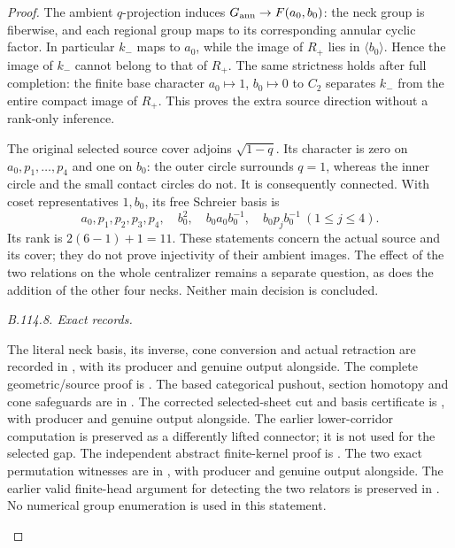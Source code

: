 \begin{proof}
The ambient $q$-projection induces
$G_{\rm ann}\to F(a_0,b_0)$: the neck group is fiberwise,
and each regional group maps to its corresponding annular
cyclic factor. In particular $k_-$ maps to $a_0$, while the
image of $R_+$ lies in $\langle b_0\rangle$. Hence the image
of $k_-$ cannot belong to that of $R_+$. The same strictness
holds after full completion: the finite base character
$a_0\mapsto1$, $b_0\mapsto0$ to $C_2$ separates $k_-$ from
the entire compact image of $\widehat R_+$. This proves the
extra source direction without a rank-only inference.

The original selected source cover adjoins $\sqrt{1-q}$. Its
character is zero on $a_0,p_1,\ldots,p_4$ and one on $b_0$:
the outer circle surrounds $q=1$, whereas the inner circle and
the small contact circles do not. It is consequently connected.
With coset representatives $1,b_0$, its free Schreier basis is
\[
 a_0,p_1,p_2,p_3,p_4,\quad b_0^2,\quad
 b_0a_0b_0^{-1},\quad b_0p_jb_0^{-1}\ (1\leq j\leq4).
\]
Its rank is $2(6-1)+1=11$. These statements concern the actual
source and its cover; they do not prove injectivity of their
ambient images. The effect of the two relations on the whole
centralizer remains a separate question, as does the addition
of the other four necks. Neither main decision is concluded.

\emph{B.114.8. Exact records.}
\begin{raggedright}
The literal neck basis, its inverse, cone conversion and actual
retraction are recorded in
,
with its producer and genuine output alongside. The complete
geometric/source proof is
.
The based categorical pushout, section homotopy and cone safeguards
are in .
The corrected selected-sheet cut and basis certificate is
,
with producer and genuine output
 alongside.
The earlier lower-corridor computation is preserved as a
differently lifted connector; it is not used for the selected gap.
The independent abstract finite-kernel proof is
.
The two exact permutation witnesses are in
, with producer
 and genuine output
alongside. The earlier valid finite-head argument for detecting the
two relators is preserved in
.
No numerical group enumeration is used in this statement.\qedhere
\par\end{raggedright}
\end{proof}
